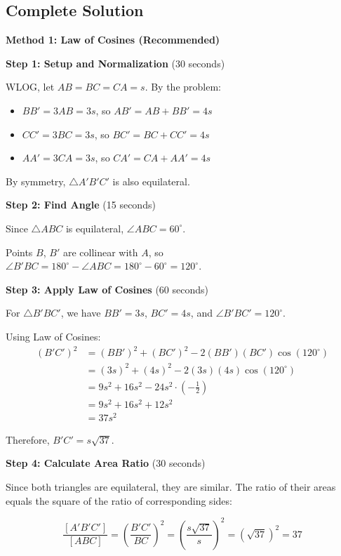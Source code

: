 \documentclass[11pt]{article}
\begin{document}
\begin{solutionbox}
\subsection*{Complete Solution}

\textbf{Method 1: Law of Cosines (Recommended)}

\textbf{Step 1: Setup and Normalization} (30 seconds)

WLOG, let $AB = BC = CA = s$. By the problem:
\begin{itemize}
    \item $BB' = 3AB = 3s$, so $AB' = AB + BB' = 4s$
    \item $CC' = 3BC = 3s$, so $BC' = BC + CC' = 4s$
    \item $AA' = 3CA = 3s$, so $CA' = CA + AA' = 4s$
\end{itemize}

By symmetry, $\triangle A'B'C'$ is also equilateral.

\textbf{Step 2: Find Angle} (15 seconds)

Since $\triangle ABC$ is equilateral, $\angle ABC = 60^{\circ}$.

Points $B$, $B'$ are collinear with $A$, so $\angle B'BC = 180^{\circ} - \angle ABC = 180^{\circ} - 60^{\circ} = 120^{\circ}$.

\textbf{Step 3: Apply Law of Cosines} (60 seconds)

For $\triangle B'BC'$, we have $BB' = 3s$, $BC' = 4s$, and $\angle B'BC' = 120^{\circ}$.

Using Law of Cosines:
\begin{align*}
    (B'C')^2 &= (BB')^2 + (BC')^2 - 2(BB')(BC')\cos(120^{\circ}) \\
    &= (3s)^2 + (4s)^2 - 2(3s)(4s)\cos(120^{\circ}) \\
    &= 9s^2 + 16s^2 - 24s^2 \cdot \left(-\frac{1}{2}\right) \\
    &= 9s^2 + 16s^2 + 12s^2 \\
    &= 37s^2
\end{align*}

Therefore, $B'C' = s\sqrt{37}$.

\textbf{Step 4: Calculate Area Ratio} (30 seconds)

Since both triangles are equilateral, they are similar. The ratio of their areas equals the square of the ratio of corresponding sides:

\[\frac{[A'B'C']}{[ABC]} = \left(\frac{B'C'}{BC}\right)^2 = \left(\frac{s\sqrt{37}}{s}\right)^2 = \left(\sqrt{37}\right)^2 = 37\]


\end{solutionbox}
\end{document}
